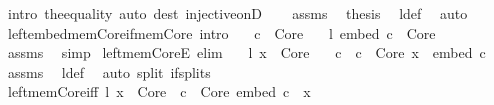\begin{isabellebody}
\ {\isacharparenleft}{\kern0pt}intro\ the{\isacharunderscore}{\kern0pt}equality{\isacharparenright}{\kern0pt}\ {\isacharparenleft}{\kern0pt}auto\ dest{\isacharcolon}{\kern0pt}\ injective{\isacharunderscore}{\kern0pt}onD{\isacharparenright}{\kern0pt}\isanewline
\ \ \isamarkupfalse%
\ assms\ \isamarkupfalse%
\ {\isacharquery}{\kern0pt}thesis\ \isamarkupfalse%
\ l{\isacharunderscore}{\kern0pt}def\ \isamarkupfalse%
\ auto\isanewline
{}\isamarkupfalse%
%
\endisatagproof
{\isafoldproof}%
%
\isadelimproof
\isanewline
%
\endisadelimproof
\isanewline
{}\isamarkupfalse%
\ left{\isacharunderscore}{\kern0pt}embed{\isacharunderscore}{\kern0pt}mem{\isacharunderscore}{\kern0pt}Core{\isacharunderscore}{\kern0pt}if{\isacharunderscore}{\kern0pt}mem{\isacharunderscore}{\kern0pt}Core\ {\isacharbrackleft}{\kern0pt}intro{\isacharbrackright}{\kern0pt}{\isacharcolon}{\kern0pt}\isanewline
\ \ \ {\isachardoublequoteopen}c\ {\isasymin}\ Core{\isachardoublequoteclose}\isanewline
\ \ \ {\isachardoublequoteopen}l\ {\isacharparenleft}{\kern0pt}embed\ c{\isacharparenright}{\kern0pt}\ {\isasymin}\ Core{\isachardoublequoteclose}\isanewline
%
\isadelimproof
\ \ %
\endisadelimproof
%
\isatagproof
{}\isamarkupfalse%
\ assms\ \isamarkupfalse%
\ simp%
\endisatagproof
{\isafoldproof}%
%
\isadelimproof
\isanewline
%
\endisadelimproof
\isanewline
{}\isamarkupfalse%
\ left{\isacharunderscore}{\kern0pt}mem{\isacharunderscore}{\kern0pt}CoreE\ {\isacharbrackleft}{\kern0pt}elim{\isacharbrackright}{\kern0pt}{\isacharcolon}{\kern0pt}\isanewline
\ \ \ {\isachardoublequoteopen}l\ x\ {\isasymin}\ Core{\isachardoublequoteclose}\isanewline
\ \ \ c\ \ {\isachardoublequoteopen}c\ {\isasymin}\ Core{\isachardoublequoteclose}\ {\isachardoublequoteopen}x\ {\isacharequal}{\kern0pt}\ embed\ c{\isachardoublequoteclose}\isanewline
%
\isadelimproof
\ \ %
\endisadelimproof
%
\isatagproof
{}\isamarkupfalse%
\ assms\ \isamarkupfalse%
\ l{\isacharunderscore}{\kern0pt}def\ \isamarkupfalse%
\ {\isacharparenleft}{\kern0pt}auto\ split{\isacharcolon}{\kern0pt}\ if{\isacharunderscore}{\kern0pt}splits{\isacharparenright}{\kern0pt}%
\endisatagproof
{\isafoldproof}%
%
\isadelimproof
\isanewline
%
\endisadelimproof
\isanewline
{}\isamarkupfalse%
\ left{\isacharunderscore}{\kern0pt}mem{\isacharunderscore}{\kern0pt}Core{\isacharunderscore}{\kern0pt}iff{\isacharcolon}{\kern0pt}\ {\isachardoublequoteopen}l\ x\ {\isasymin}\ Core\ {\isasymlongleftrightarrow}\ {\isacharparenleft}{\kern0pt}{\isasymexists}c\ {\isasymin}\ Core{\isachardot}{\kern0pt}\ embed\ c\ {\isacharequal}{\kern0pt}\ x{\isacharparenright}{\kern0pt}{\isachardoublequoteclose}\isanewline

\end{isabellebody}
